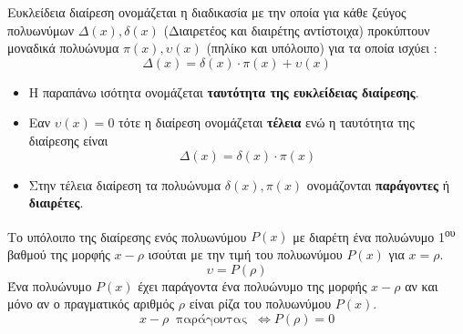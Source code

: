 \documentclass[twoside,nofonts,internet,shmeiwseis]{thewria}
\newcommand{\tss}[1]{\textsuperscript{#1}}
\begin{document}
\orismoi
{}
Ευκλείδεια διαίρεση ονομάζεται η διαδικασία με την οποία για κάθε ζεύγος πολυωνύμων $ \varDelta(x),\delta(x) $ (Διαιρετέος και διαιρέτης αντίστοιχα) προκύπτουν μοναδικά πολυώνυμα $ \pi(x),\upsilon(x) $ (πηλίκο και υπόλοιπο) για τα οποία ισχύει :
\[ \varDelta(x)=\delta(x)\cdot\pi(x)+\upsilon(x) \]
\begin{itemize}[itemsep=0mm]
\item Η παραπάνω ισότητα ονομάζεται \textbf{ταυτότητα της ευκλείδειας διαίρεσης}.
\item Εαν $ \upsilon(x)=0 $ τότε η διαίρεση ονομάζεται \textbf{τέλεια} ενώ η ταυτότητα της διαίρεσης είναι
\[ \varDelta(x)=\delta(x)\cdot\pi(x) \]
\item Στην τέλεια διαίρεση τα πολυώνυμα $ \delta(x),\pi(x) $ ονομάζονται \textbf{παράγοντες} ή \textbf{διαιρέτες}.
\end{itemize}
\thewrhmata
{}
Το υπόλοιπο της διαίρεσης ενός πολυωνύμου $ P(x) $ με διαρέτη ένα πολυώνυμο 1\tss{ου} βαθμού της μορφής $ x-\rho $ ισούται με την τιμή του πολυωνύμου $ P(x) $ για $ x=\rho $.
\[ \upsilon=P(\rho) \]
Ένα πολυώνυμο $ P(x) $ έχει παράγοντα ένα πολυώνυμο της μορφής $ x-\rho $ αν και μόνο αν ο πραγματικός αριθμός $ \rho $ είναι ρίζα του πολυωνύμου $ P(x) $.
\[ x-\rho\ \textrm{ παράγοντας }\ \Leftrightarrow P(\rho)=0 \]
\end{document}
